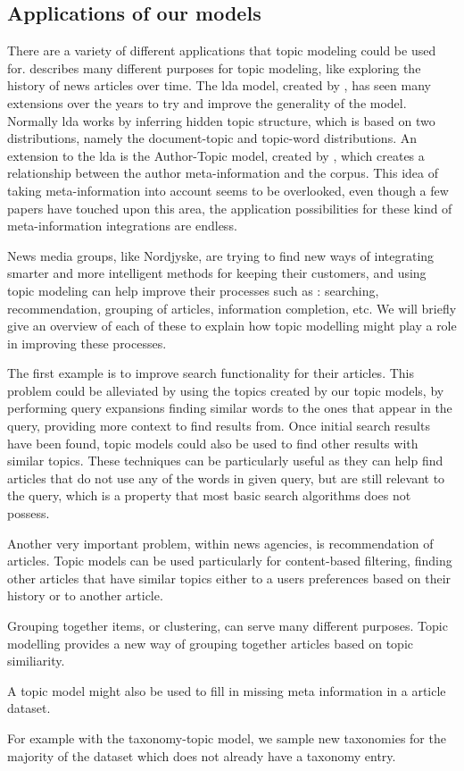 \subsection{Applications of our models}\label{sec:appendix_applications}
There are a variety of different applications that topic modeling could be used for. 
\citet{Probabilistic_Topic_Models} describes many different purposes for topic modeling, like exploring the history of news articles over time.
The \gls{lda} model, created by \citet{blei2003latent}, has seen many extensions over the years to try and improve the generality of the model.
Normally \gls{lda} works by inferring hidden topic structure, which is based on two distributions, namely the document-topic and topic-word distributions.
An extension to the \gls{lda} is the Author-Topic model, created by \citet{author_topic_2012}, which creates a relationship between the author meta-information and the corpus.
This idea of taking meta-information into account seems to be overlooked, even though a few papers have touched upon this area, the application possibilities for these kind of meta-information integrations are endless.

News media groups, like Nordjyske, are trying to find new ways of integrating smarter and more intelligent methods for keeping their customers, and using topic modeling can help improve their processes such as : searching, recommendation, grouping of articles, information completion, etc.
We will briefly give an overview of each of these to explain how topic modelling might play a role in improving these processes.

The first example is to improve search functionality for their articles.
This problem could be alleviated by using the topics created by our topic models, by performing query expansions finding similar words to the ones that appear in the query, providing more context to find results from.
Once initial search results have been found, topic models could also be used to find other results with similar topics.
These techniques can be particularly useful as they can help find articles that do not use any of the words in given query, but are still relevant to the query, which is a property that most basic search algorithms does not possess.

Another very important problem, within news agencies, is recommendation of articles.
Topic models can be used particularly for content-based filtering, finding other articles that have similar topics either to a users preferences based on their history or to another article.

Grouping together items, or clustering, can serve many different purposes. Topic modelling provides a new way of grouping together articles based on topic similiarity.

A topic model might also be used to fill in missing meta information in a article dataset.

For example with the taxonomy-topic model, we sample new taxonomies for the majority of the dataset which does not already have a taxonomy entry.

